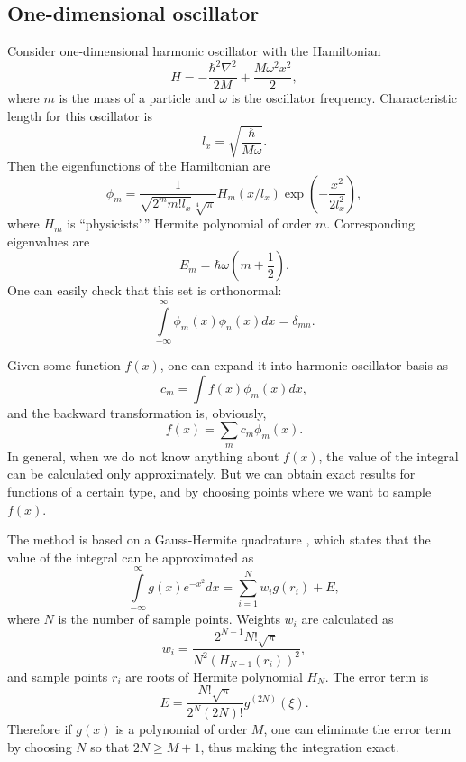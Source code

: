 \subsection{One-dimensional oscillator}

Consider one-dimensional harmonic oscillator with the Hamiltonian
\[
    H = -\frac{\hbar^2 \nabla^2}{2 M} + \frac{M \omega^2 x^2}{2},
\]
where $m$ is the mass of a particle and $\omega$ is the oscillator frequency.
Characteristic length for this oscillator is
\[
    l_x = \sqrt{\frac{\hbar}{M \omega}}.
\]
Then the eigenfunctions of the Hamiltonian are
\begin{equation}
\label{eqn:harmonic-transform:harmonic-modes}
    \phi_m = \frac{1}{\sqrt{2^m m! l_x} \sqrt[4]{\pi}} H_m(x / l_x)
        \exp \left( -\frac{x^2}{2 l_x^2} \right),
\end{equation}
where $H_m$ is ``physicists'\,'' Hermite polynomial of order $m$.
Corresponding eigenvalues are
\[
    E_m = \hbar \omega (m + \frac{1}{2}).
\]
One can easily check that this set is orthonormal:
\[
    \int\limits_{-\infty}^{\infty} \phi_m(x) \phi_n(x) dx = \delta_{mn}.
\]

Given some function $f(x)$, one can expand it into harmonic oscillator basis as
\[
    c_m = \int f(x) \phi_m(x) dx,
\]
and the backward transformation is, obviously,
\[
    f(x) = \sum_{m} c_m \phi_m(x).
\]
In general, when we do not know anything about $f(x)$,
the value of the integral can be calculated only approximately.
But we can obtain exact results for functions of a certain type,
and by choosing points where we want to sample $f(x)$.

The method is based on a Gauss-Hermite quadrature ,
which states that the value of the integral can be approximated as
\[
    \int\limits_{-\infty}^{\infty} g(x) e^{-x^2} dx
    = \sum_{i=1}^N w_i g(r_i) + E,
\]
where $N$ is the number of sample points.
Weights $w_i$ are calculated as
\[
    w_i = \frac{2^{N-1} N! \sqrt{\pi}}{N^2 (H_{N-1}(r_i))^2},
\]
and sample points $r_i$ are roots of Hermite polynomial $H_N$.
The error term is
\[
    E = \frac{N! \sqrt{\pi}}{2^N (2N)!} g^{(2N)}(\xi).
\]
Therefore if $g(x)$ is a polynomial of order $M$,
one can eliminate the error term by choosing $N$ so that $2N \ge M + 1$,
thus making the integration exact.

